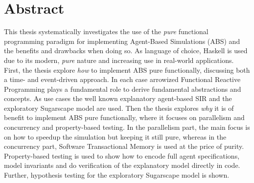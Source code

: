 \documentclass[oneside]{book}
\newcommand\blankpage{%
    \null
    \thispagestyle{empty}%
    \addtocounter{page}{-1}%
    \newpage}
\begin{document}
\cleardoublepage
\afterpage{\blankpage}

\clearpage
\tableofcontents

\newpage

\thispagestyle{plain}

\section*{Abstract}
This thesis systematically investigates the use of the \textit{pure} functional programming paradigm for implementing Agent-Based Simulations (ABS) and the benefits and drawbacks when doing so. As language of choice, Haskell is used due to its modern, \textit{pure} nature and increasing use in real-world applications. First, the thesis explore \textit{how} to implement ABS pure functionally, discussing both a time- and event-driven approach. In each case arrowized Functional Reactive Programming plays a fundamental role to derive fundamental abstractions and concepts. As use cases the well known explanatory agent-based SIR and the exploratory Sugarscape model are used. Then the thesis explores \textit{why} it is of benefit to implement ABS pure functionally, where it focuses on parallelism and concurrency and property-based testing. In the parallelism part, the main focus is on how to speedup the simulation but keeping it still pure, whereas in the concurrency part, Software Transactional Memory is used at the price of purity. Property-based testing is used to show how to encode full agent specifications, model invariants and do verification of the explanatory model directly in code. Further, hypothesis testing for the exploratory Sugarscape model is shown.

\clearpage

\end{document}
